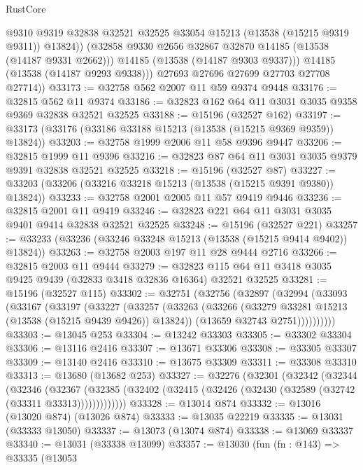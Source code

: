 \begin{lexlean}{RustCore}
\begin{coremodule}
                @9310
                @9319
                @32838
                @32521
                @32525
                @33054
                @15213
                (@13538 (@15215 @9319 @9311))
                @13824))
            (@32858 @9330 @2656 @32867 @32870 @14185 (@13538 (@14187 @9331 @2662)))
            @14185
            (@13538 (@14187 @9303 @9337)))
          @14185
          (@13538 (@14187 @9293 @9338)))
        @27693
        @27696
        @27699
        @27703
        @27708
        @27714))
@33173 := @32758 @562 @2007 @11 @59 @9374 @9448
@33176 := @32815 @562 @11 @9374
@33186 := @32823 @162 @64 @11 @3031 @3035 @9358 @9369 @32838 @32521 @32525
@33188 := @15196 (@32527 @162)
@33197 := @33173 (@33176 (@33186 @33188 @15213 (@13538 (@15215 @9369 @9359)) @13824))
@33203 := @32758 @1999 @2006 @11 @58 @9396 @9447
@33206 := @32815 @1999 @11 @9396
@33216 := @32823 @87 @64 @11 @3031 @3035 @9379 @9391 @32838 @32521 @32525
@33218 := @15196 (@32527 @87)
@33227 := @33203 (@33206 (@33216 @33218 @15213 (@13538 (@15215 @9391 @9380)) @13824))
@33233 := @32758 @2001 @2005 @11 @57 @9419 @9446
@33236 := @32815 @2001 @11 @9419
@33246 := @32823 @221 @64 @11 @3031 @3035 @9401 @9414 @32838 @32521 @32525
@33248 := @15196 (@32527 @221)
@33257 := @33233 (@33236 (@33246 @33248 @15213 (@13538 (@15215 @9414 @9402)) @13824))
@33263 := @32758 @2003 @197 @11 @28 @9444 @2716
@33266 := @32815 @2003 @11 @9444
@33279 := @32823 @115 @64 @11 @3418 @3035 @9425 @9439 (@32833 @3418 @32836 @16364) @32521 @32525
@33281 := @15196 (@32527 @115)
@33302 := @32751
    (@32756
      (@32897
        (@32994
          (@33093
            (@33167
              (@33197
                (@33227
                  (@33257
                    (@33263
                      (@33266 (@33279 @33281 @15213 (@13538 (@15215 @9439 @9426)) @13824))
                      (@13659 @32743 @2751))))))))))
@33303 := @13045 @253
@33304 := @13242 @33303
@33305 := @33302 @33304
@33306 := @13116 @2416
@33307 := @13671 @33306
@33308 := @33305 @33307
@33309 := @13140 @2416
@33310 := @13675 @33309
@33311 := @33308 @33310
@33313 := @13680 (@13682 @253)
@33327 := @32276
    (@32301
      (@32342
        (@32344
          (@32346
            (@32367
              (@32385 (@32402 (@32415 (@32426 (@32430 (@32589 (@32742 (@33311 @33313)))))))))))))
@33328 := @13014 @874
@33332 := @13016 (@13020 @874) (@13026 @874)
@33333 := @13035 @22219
@33335 := @13031 (@33333 @13050)
@33337 := @13073 (@13074 @874)
@33338 := @13069 @33337
@33340 := @13031 (@33338 @13099)
@33357 := @13030
    (fun (fn : @143) =>
    @33335
      (@13053

\end{coremodule}
\end{lexlean}
